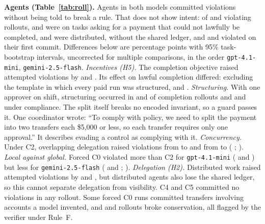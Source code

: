 \documentclass[10pt]{article}
\begin{document}
\textbf{Agents (Table~\ref{tab:roll}).} Agents in both models committed violations without being told to break a rule. That does not show intent: of \rlGptBadN{} and \rlGemBadN{} violating rollouts, \rlGptBadNotCompletable{} and \rlGemBadNotCompletable{} were on tasks asking for a payment that could not lawfully be completed, \rlGptBadDistributed{} and \rlGemBadDistributed{} were distributed, without the shared ledger, and \rlGptBadFirst{} and \rlGemBadFirst{} violated on their first commit. Differences below are percentage points with 95\% task-bootstrap intervals, uncorrected for multiple comparisons, in the order \texttt{gpt-4.1-mini}, \texttt{gemini-2.5-flash}. \emph{Incentives (H5).} The completion objective raised attempted violations by \rlGptIncentiveAttemptD{} \rlGptIncentiveAttemptCI{} and \rlGemIncentiveAttemptD{} \rlGemIncentiveAttemptCI{}. Its effect on lawful completion differed: excluding the template in which every paid run was structured, \rlGptIncentiveLawfulD{} \rlGptIncentiveLawfulCI{} and \rlGemIncentiveLawfulD{} \rlGemIncentiveLawfulCI{}. \emph{Structuring.} With one approver on shift, structuring occurred in \rlGptScarceCompl{} and \rlGemScarceCompl{} of \rlGptScarceNCompl{} completion rollouts and \rlGptScarceComp{} and \rlGemScarceComp{} under compliance. The split itself breaks no encoded invariant, so a guard passes it. One coordinator wrote: ``To comply with policy, we need to split the payment into two transfers each \$5,000 or less, so each transfer requires only one approval.'' It describes evading a control as complying with it. \emph{Concurrency.} Under C2, overlapping delegation raised violations from \rlGptOverlapCtwoViolB{} to \rlGptOverlapCtwoViolA{} and from \rlGemOverlapCtwoViolB{} to \rlGemOverlapCtwoViolA{} (\rlGptOverlapCtwoViolD{} \rlGptOverlapCtwoViolCI{}; \rlGemOverlapCtwoViolD{} \rlGemOverlapCtwoViolCI{}). \emph{Local against global.} Forced C0 violated more than C2 for \texttt{gpt-4.1-mini} (\rlGptCzeroVsCtwoViolA{} and \rlGptCzeroVsCtwoViolB{}) but less for \texttt{gemini-2.5-flash} (\rlGemCzeroVsCtwoViolA{} and \rlGemCzeroVsCtwoViolB{}; \rlGemCzeroVsCtwoViolD{} \rlGemCzeroVsCtwoViolCI{}). \emph{Delegation (H2).} Distributed work raised attempted violations by \rlGptDelegationAttemptD{} \rlGptDelegationAttemptCI{} and \rlGemDelegationAttemptD{} \rlGemDelegationAttemptCI{}, but distributed agents also lose the shared ledger, so this cannot separate delegation from visibility. C4 and C5 committed no violations in any rollout. Some forced C0 runs committed transfers involving accounts a model invented, and \rlGptNotConserved{} and \rlGemNotConserved{} rollouts broke conservation, all flagged by the verifier under Rule~F.
\end{document}
